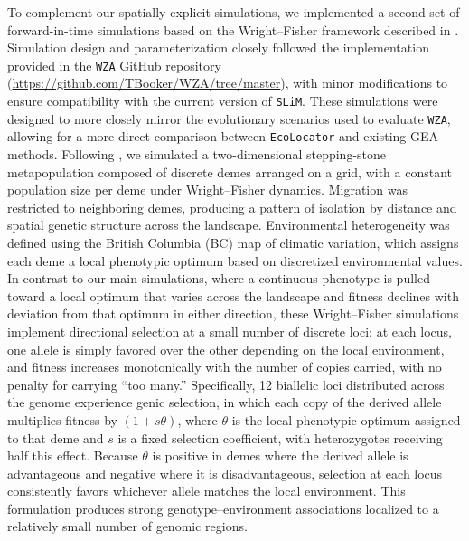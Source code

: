 \documentclass[]{article}
\newcommand{\ecolocator}{\texttt{EcoLocator}\xspace}
\newcommand{\slim}{\texttt{SLiM}\xspace}
\begin{document}
To complement our spatially explicit simulations,
we implemented a second set of forward-in-time simulations
based on the Wright--Fisher framework
described in \citet{booker_wza_2024}.
Simulation design and parameterization closely followed
the implementation provided in the \texttt{WZA} GitHub repository
(\url{https://github.com/TBooker/WZA/tree/master}),
with minor modifications to ensure compatibility
with the current version of \slim.
These simulations were designed to more closely mirror
the evolutionary scenarios used to evaluate \texttt{WZA},
allowing for a more direct comparison
between \ecolocator and existing GEA methods.
Following \citet{booker_wza_2024},
we simulated a two-dimensional stepping-stone metapopulation
composed of discrete demes arranged on a grid,
with a constant population size per deme
under Wright--Fisher dynamics.
Migration was restricted to neighboring demes,
producing a pattern of isolation by distance
and spatial genetic structure across the landscape.
Environmental heterogeneity was defined
using the British Columbia (BC) map of climatic variation,
which assigns each deme a local phenotypic optimum
based on discretized environmental values.
In contrast to our main simulations,
where a continuous phenotype is pulled toward a local optimum 
that varies across the landscape and fitness declines with deviation 
from that optimum in either direction,
these Wright--Fisher simulations implement directional selection
at a small number of discrete loci:
at each locus, one allele is simply favored over the other 
depending on the local environment, 
and fitness increases monotonically with the number of copies carried, 
with no penalty for carrying ``too many.''
Specifically, 12 biallelic loci distributed across the genome
experience genic selection,
in which each copy of the derived allele 
multiplies fitness by $(1 + s\theta)$, 
where $\theta$ is the local phenotypic optimum assigned to that
deme and $s$ is a fixed selection coefficient, with 
heterozygotes receiving half this effect. 
Because $\theta$ is positive in demes where the 
derived allele is advantageous and negative where it is 
disadvantageous, selection at each locus consistently 
favors whichever allele matches the local environment.
This formulation produces strong genotype--environment associations
localized to a relatively small number of genomic regions.
\end{document}
